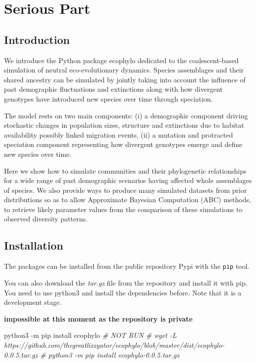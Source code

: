\documentclass[
]{article}
\newenvironment{Shaded}{\begin{snugshade}}{\end{snugshade}}
\newcommand{\CommentTok}[1]{\textcolor[rgb]{0.56,0.35,0.01}{\textit{#1}}}
\newcommand{\ExtensionTok}[1]{#1}
\newcommand{\NormalTok}[1]{#1}
\begin{document}
\newpage

\hypertarget{serious-part}{%
\section{Serious Part}\label{serious-part}}

\hypertarget{introduction}{%
\subsection{Introduction}\label{introduction}}

We introduce the Python package ecophylo dedicated to the
coalescent-based simulation of neutral eco-evolutionary dynamics.
Species assemblages and their shared ancestry can be simulated by
jointly taking into account the influence of past demographic
fluctuations and extinctions along with how divergent genotypes have
introduced new species over time through speciation.

The model rests on two main components: (i) a demographic component
driving stochastic changes in population sizes, structure and
extinctions due to habitat availability possibly linked migration
events, (ii) a mutation and protracted speciation component representing
how divergent genotypes emerge and define new species over time.

Here we show how to simulate communities and their phylogenetic
relationships for a wide range of past demographic scenarios having
affected whole assemblages of species. We also provide ways to produce
many simulated datasets from prior distributions so as to allow
Approximate Bayesian Computation (ABC) methods, to retrieve likely
parameter values from the comparison of these simulations to observed
diversity patterns.

\hypertarget{installation}{%
\subsection{Installation}\label{installation}}

The packages can be installed from the public repository Pypi with the
\texttt{pip} tool.

You can also download the \emph{tar.gz} file from the repository and
install it with pip. You need to use python3 and install the
dependencies before. Note that it is a development stage.

\textbf{impossible at this moment as the repository is private}

\begin{Shaded}
\begin{Highlighting}[]
\ExtensionTok{python3}\NormalTok{ {-}m pip install ecophylo}
\CommentTok{\# NOT RUN}
\CommentTok{\# wget {-}L https://github.com/thegreatlizzyator/ecophylo/blob/master/dist/ecophylo{-}0.0.5.tar.gz}
\CommentTok{\# python3 {-}m pip install ecophylo{-}0.0.5.tar.gz}
\end{Highlighting}
\end{Shaded}
\end{document}

